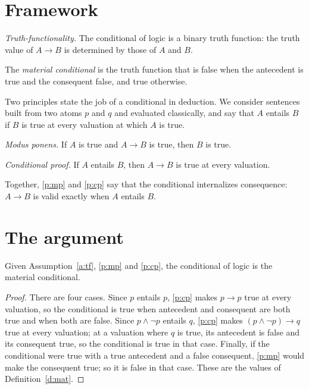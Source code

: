 \documentclass{situationist-preprint}
\begin{document}
\section{Framework}

\begin{assumption}\label{a:tf}
\emph{Truth-functionality.} The conditional of logic is a binary truth function: the truth value of $A \to B$ is determined by those of $A$ and $B$.
\end{assumption}

\begin{definition}\label{d:mat}
The \emph{material conditional} is the truth function that is false when the antecedent is true and the consequent false, and true otherwise.
\end{definition}

Two principles state the job of a conditional in deduction. We consider sentences built from two atoms $p$ and $q$ and evaluated classically, and say that $A$ entails $B$ if $B$ is true at every valuation at which $A$ is true.

\begin{principle}\label{p:mp}
\emph{Modus ponens.} If $A$ is true and $A \to B$ is true, then $B$ is true.
\end{principle}

\begin{principle}\label{p:cp}
\emph{Conditional proof.} If $A$ entails $B$, then $A \to B$ is true at every valuation.
\end{principle}

Together, \ref{p:mp} and \ref{p:cp} say that the conditional internalizes consequence: $A \to B$ is valid exactly when $A$ entails $B$.

\section{The argument}

\begin{theorem}\label{t:unique}
Given Assumption~\ref{a:tf}, \ref{p:mp} and \ref{p:cp}, the conditional of logic is the material conditional.
\end{theorem}

\begin{proof}
There are four cases. Since $p$ entails $p$, \ref{p:cp} makes $p \to p$ true at every valuation, so the conditional is true when antecedent and consequent are both true and when both are false. Since $p \wedge \neg p$ entails $q$, \ref{p:cp} makes $(p \wedge \neg p) \to q$ true at every valuation; at a valuation where $q$ is true, its antecedent is false and its consequent true, so the conditional is true in that case. Finally, if the conditional were true with a true antecedent and a false consequent, \ref{p:mp} would make the consequent true; so it is false in that case. These are the values of Definition~\ref{d:mat}.
\end{proof}
\end{document}
